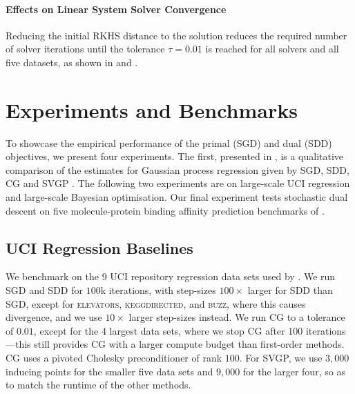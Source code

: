 \paragraph{Effects on Linear System Solver Convergence}
Reducing the initial RKHS distance to the solution reduces the required number of solver iterations until the tolerance $\tau = 0.01$ is reached for all solvers and all five datasets, as shown in  and .

\section{Experiments and Benchmarks}\label{sec:experiments}

To showcase the empirical performance of the primal (SGD) and dual (SDD) objectives, we present four experiments. The first, presented in , is a qualitative comparison of the estimates for Gaussian process regression given by SGD, SDD, CG \cite{wang2019exact} and SVGP \cite{hensman2013gaussian}. The following two experiments are on large-scale UCI regression and large-scale Bayesian optimisation. Our final experiment tests stochastic dual descent on five molecule-protein binding affinity prediction benchmarks of \textcite{Ortegon2022dockstring}. 
\subsection{UCI Regression Baselines}

We benchmark on the 9 UCI repository regression data sets \cite{dua2019UCI} used by \textcite{wang2019exact}. 
We run SGD and SDD for $100$k iterations, with step-sizes $100\times$ larger for SDD than SGD, except for \textsc{elevators}, \textsc{keggdirected}, and \textsc{buzz}, where this causes divergence, and we use $10\times$ larger step-sizes instead. We run CG to a tolerance of $0.01$, except for the 4 largest data sets, where we stop CG after 100 iterations---this still provides CG with a larger compute budget than first-order methods. 
CG uses a pivoted Cholesky preconditioner of rank $100$.
For SVGP, we use $3,000$ inducing points for the smaller five data sets and $9,000$ for the larger four, so as to match the runtime of the other methods. 


